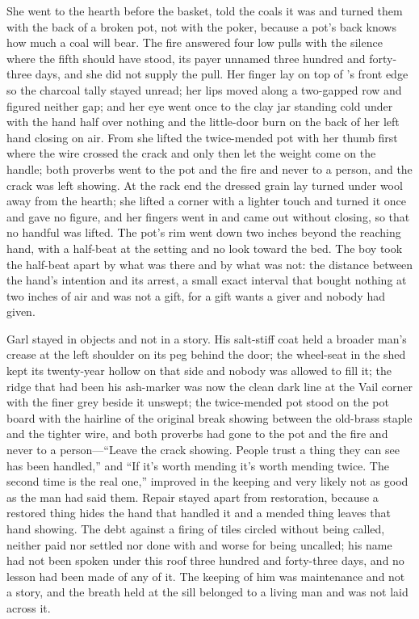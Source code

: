 She went to the hearth before the basket, told the coals it was  and turned them with the back of a broken pot, not with the poker, because a pot's back knows how much a coal will bear. The fire answered four low pulls with the silence where the fifth should have stood, its payer unnamed three hundred and forty-three days, and she did not supply the pull. Her finger lay on top of 's front edge so the charcoal tally stayed unread; her lips moved along a two-gapped row and figured neither gap; and her eye went once to the clay jar standing cold under  with the hand half over nothing and the little-door burn on the back of her left hand closing on air. From  she lifted the twice-mended pot with her thumb first where the wire crossed the crack and only then let the weight come on the handle; both proverbs went to the pot and the fire and never to a person, and the crack was left showing. At the rack end the dressed grain lay turned under wool away from the hearth; she lifted a corner with a lighter touch and turned it once and gave no figure, and her fingers went in and came out without closing, so that no handful was lifted. The pot's rim went down two inches beyond the reaching hand, with a half-beat at the setting and no look toward the bed. The boy took the half-beat apart by what was there and by what was not: the distance between the hand's intention and its arrest, a small exact interval that bought nothing at two inches of air and was not a gift, for a gift wants a giver and nobody had given.

Garl stayed in objects and not in a story. His salt-stiff coat held a broader man's crease at the left shoulder on its peg behind the door; the wheel-seat in the shed kept its twenty-year hollow on that side and nobody was allowed to fill it; the ridge that had been his ash-marker was now the clean dark line at the Vail corner with the finer grey beside it unswept; the twice-mended pot stood on the pot board with the hairline of the original break showing between the old-brass staple and the tighter wire, and both proverbs had gone to the pot and the fire and never to a person---“Leave the crack showing. People trust a thing they can see has been handled,” and “If it's worth mending it's worth mending twice. The second time is the real one,” improved in the keeping and very likely not as good as the man had said them. Repair stayed apart from restoration, because a restored thing hides the hand that handled it and a mended thing leaves that hand showing. The debt against a firing of tiles circled without being called, neither paid nor settled nor done with and worse for being uncalled; his name had not been spoken under this roof three hundred and forty-three days, and no lesson had been made of any of it. The keeping of him was maintenance and not a story, and the breath held at the sill belonged to a living man and was not laid across it.

